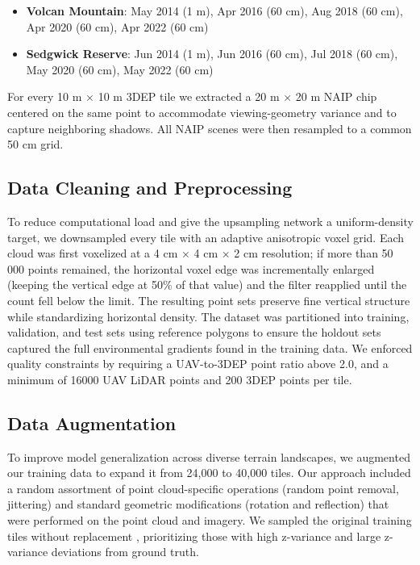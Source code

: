 \documentclass[preprint,12pt,authoryear]{elsarticle}
\begin{document}
\begin{itemize}[leftmargin=1.5em]
  \item \textbf{Volcan Mountain}: May 2014 (1 m), Apr 2016 (60 cm), Aug 2018 (60 cm), Apr 2020 (60 cm), Apr 2022 (60 cm)
  \item \textbf{Sedgwick Reserve}: Jun 2014 (1 m), Jun 2016 (60 cm), Jul 2018 (60 cm), May 2020 (60 cm), May 2022 (60 cm)
\end{itemize}

For every 10 m × 10 m 3DEP tile we extracted a 20 m × 20 m NAIP chip centered on the same point to accommodate viewing-geometry variance and to capture neighboring shadows.  All NAIP scenes were then resampled to a common 50 cm grid.



\subsection{Data Cleaning and Preprocessing}
To reduce computational load and give the upsampling network a uniform-density target, we downsampled every tile with an adaptive anisotropic voxel grid. Each cloud was first voxelized at a 4 cm × 4 cm × 2 cm resolution; if more than 50 000 points remained, the horizontal voxel edge was incrementally enlarged (keeping the vertical edge at 50\% of that value) and the filter reapplied until the count fell below the limit. The resulting point sets preserve fine vertical structure while standardizing horizontal density. The dataset was partitioned into training, validation, and test sets using reference polygons to ensure the holdout sets captured the full environmental gradients found in the training data. We enforced quality constraints by requiring a UAV-to-3DEP point ratio above 2.0, and a minimum of 16000 UAV LiDAR points and 200 3DEP points per tile.


\subsection{Data Augmentation}
To improve model generalization across diverse terrain landscapes, we augmented our training data to expand it from 24,000 to 40,000 tiles. Our approach included a random assortment of point cloud-specific operations (random point removal, jittering) and standard geometric modifications (rotation and reflection) that were performed on the point cloud and imagery. We sampled the original training tiles without replacement , prioritizing those with high z-variance and large z-variance deviations from ground truth. 
\end{document}
